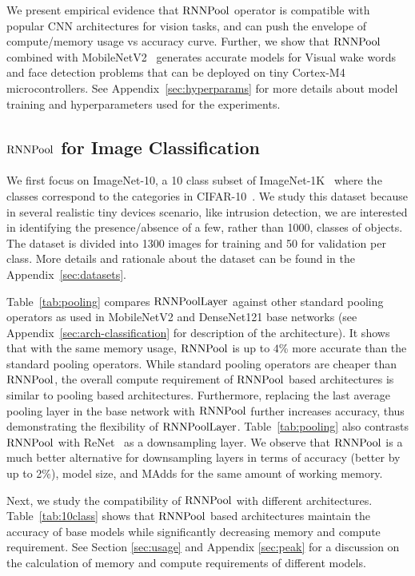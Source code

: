 \documentclass[10pt]{article}
\newcommand{\rpool}{\ensuremath{{\rm RNNPool}}\xspace}
\newcommand{\rpoollayer}{\ensuremath{{\rm RNNPoolLayer}}\xspace}
\newcommand{\alg}{\rpool}
\begin{document}
We present empirical evidence that \rpool operator is compatible with
popular CNN architectures for vision tasks, and can push the envelope
of compute/memory usage vs accuracy curve. Further, we show
that \rpool combined with MobileNetV2~\citep{sandler2018mobilenetv2}
generates accurate models for Visual wake words and face detection
problems that can be deployed on tiny Cortex-M4 microcontrollers. See
Appendix~\ref{sec:hyperparams} for more details about model training
and hyperparameters used for the experiments.

\subsection{\alg for Image Classification}\label{sec:exp_class}

We first focus on ImageNet-10, a 10 class subset of
ImageNet-1K~\citep{deng2009imagenet} where the classes correspond to
the categories in CIFAR-10~\citep{krizhevsky2009learning}.  We study
this dataset because in several realistic tiny devices scenario, like
intrusion detection, we are interested in identifying the presence/absence
of a few, rather than 1000, classes of objects. The dataset is divided
into 1300 images for training and 50 for validation per class.  More
details and rationale about the dataset can be found in the
Appendix~\ref{sec:datasets}.


Table~\ref{tab:pooling} compares \rpoollayer against other standard
pooling operators as used in MobileNetV2 and DenseNet121 base networks
(see Appendix~\ref{sec:arch-classification} for description of the
architecture).  It shows that with the same memory usage, \rpool is up
to $4$\% more accurate than the standard pooling operators. While
standard pooling operators are cheaper than \rpool, the overall
compute requirement of \rpool based architectures is similar to
pooling based architectures. Furthermore, replacing the last average
pooling layer in the base network with \rpool further increases
accuracy, thus demonstrating the flexibility
of \rpoollayer. Table~\ref{tab:pooling} also contrasts \rpool with
ReNet~\citep{visin2015renet} as a downsampling layer. We observe
that \rpool is a much better alternative for downsampling layers in
terms of accuracy (better by up to 2\%), model size, and MAdds for the
same amount of working memory.


Next, we study the compatibility of \rpool with different
architectures. Table~\ref{tab:10class} shows that \rpool based
architectures maintain the accuracy of base models while significantly
decreasing memory and compute requirement. See Section \ref{sec:usage}
and Appendix \ref{sec:peak} for a discussion on the calculation of
memory and compute requirements of different models.
\end{document}
